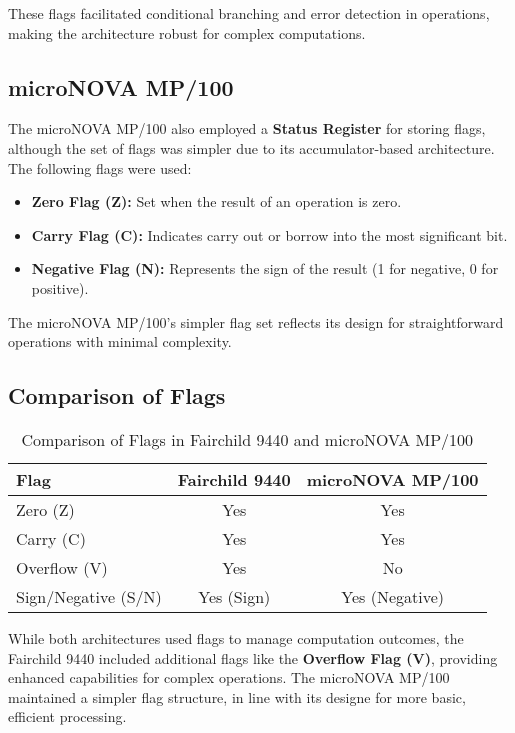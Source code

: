 \documentclass[a4paper,12pt]{article}
\begin{document}
These flags facilitated conditional branching and error detection in operations, making the architecture robust for complex computations.

\subsection{microNOVA MP/100}

The microNOVA MP/100 also employed a \textbf{Status Register} for storing flags, although the set of flags was simpler due to its accumulator-based architecture. The following flags were used:
\begin{itemize}
    \item \textbf{Zero Flag (Z):} Set when the result of an operation is zero.
    \item \textbf{Carry Flag (C):} Indicates carry out or borrow into the most significant bit.
    \item \textbf{Negative Flag (N):} Represents the sign of the result (1 for negative, 0 for positive).
\end{itemize}

The microNOVA MP/100’s simpler flag set reflects its design for straightforward operations with minimal complexity.

\subsection{Comparison of Flags}

\begin{table}[H]
\centering
\begin{tabular}{|l|c|c|}
\hline
\textbf{Flag}          & \textbf{Fairchild 9440} & \textbf{microNOVA MP/100} \\ \hline
Zero (Z)               & Yes                     & Yes                       \\ \hline
Carry (C)              & Yes                     & Yes                       \\ \hline
Overflow (V)           & Yes                     & No                        \\ \hline
Sign/Negative (S/N)    & Yes (Sign)              & Yes (Negative)            \\ \hline
\end{tabular}
\caption{Comparison of Flags in Fairchild 9440 and microNOVA MP/100}
\end{table}


While both architectures used flags to manage computation outcomes, the Fairchild 9440 included additional flags like the \textbf{Overflow Flag (V)}, providing enhanced capabilities for complex operations. The microNOVA MP/100 maintained a simpler flag structure, in line with its designe for more basic, efficient processing.
\end{document}
